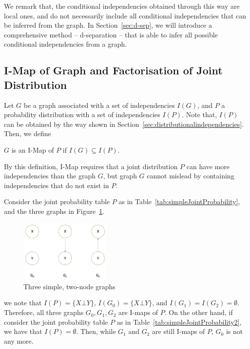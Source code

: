 We remark that, the conditional independencies obtained through this way are local ones, and do not necessarily include all conditional independencies that can be inferred from the graph. In Section~\ref{sec:d-sep}, we will introduce a comprehensive method -- d-separation -- that is able to infer all possible conditional independencies from a graph. 

\subsection{I-Map of Graph and Factorisation of Joint Distribution}

Let $G$ be a graph associated with a set of independencies $I(G)$, and $P$ a probability distribution with a set of independencies $I(P)$. Note that, $I(P)$ can be obtained by the way shown in Section~\ref{sec:distributionalindependencies}. Then, we define 

\begin{definition}
$G$ is an I-Map of $P$ if $I(G)\subseteq I(P)$. 
\end{definition}

By this definition, I-Map requires that a joint
distribution $P$ can have more independencies than the graph $G$, but 
graph $G$ cannot mislead by containing independencies that do not exist in $P$. 

\begin{example}
Consider the joint probability table $P$ as in Table~\ref{tab:simpleJointProbability}, and the  three graphs in Figure~\ref{fig:simpleGs}. 
\begin{figure}[!htbp]
    \centering
    \includegraphics[width=0.4\textwidth]{images/graphical models/I-map/simpleGs.png}
    \caption{Three simple, two-node graphs}
    \label{fig:simpleGs}
\end{figure}
we note that $I(P)=\{X\bot Y\}$, $I(G_0)=\{X\bot Y\}$, and $I(G_1)=I(G_2)=\emptyset$. Therefore, all three graphs $G_0, G_1, G_2$ are I-maps of $P$. On the other hand, if consider  the joint probability table $P$ as in Table~\ref{tab:simpleJointProbability2}, we have that $I(P)=\emptyset$. Then, while $G_1$ and $ G_2$ are still I-maps of $P$, $G_0$ is not any more. 
\end{example}


